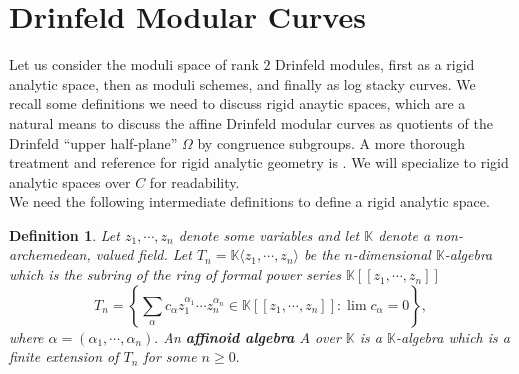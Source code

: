 \documentclass[11pt]{amsart}
\newtheorem{definition}[theorem]{Definition}
\newtheorem{example}[theorem]{Example}
\theoremstyle{definition}
\numberwithin{equation}{section}
\newcommand{\GL}{\mathrm{GL}} 	%
\newcommand{\bbA}{\mathbb{A}}		%
\newcommand{\bbK}{\mathbb{K}}		%
\begin{document}
		\section{Drinfeld Modular Curves}
		\label{s: Drinfeld modular curves}
		
		Let us consider the moduli space of rank $2$ Drinfeld modules, first as a rigid analytic space, then as moduli schemes, and finally as log stacky curves. We recall some definitions we need to discuss rigid anaytic spaces, which are a natural means to discuss the affine Drinfeld modular curves as quotients of the Drinfeld ``upper half-plane'' $\Omega$ by congruence subgroups. A more thorough treatment and reference for rigid analytic geometry is \cite{Frensel-vanderPut-Rigid-Analytic_Geom}. We will specialize to rigid analytic spaces over $C$ for readability.\\
		
		We need the following intermediate definitions to define a rigid analytic space. 
		\begin{definition}%
			Let $z_1,\cdots, z_n$ denote some variables and let $\bbK$ denote a non-archemedean, valued field. Let $T_n=\bbK\langle z_1,\cdots, z_n\rangle$ be the $n$-dimensional $\bbK$-algebra which is the subring of the ring of formal power series $\bbK[\![z_1,\cdots, z_n]\!]$ 
			\[T_n=\left\{\sum_{\alpha} c_{\alpha}z_1^{\alpha_1}\cdots z_n^{\alpha_n}\in \bbK[\![z_1,\cdots, z_n]\!] :\lim c_{\alpha}=0\right\},\] 
			where $\alpha = (\alpha_1,\cdots,\alpha_n).$ An \textbf{affinoid algebra} $A$ over $\bbK$ is a $\bbK$-algebra which is a finite extension of $T_n$ for some $n\geq 0.$
		\end{definition} 
		
\end{document}
